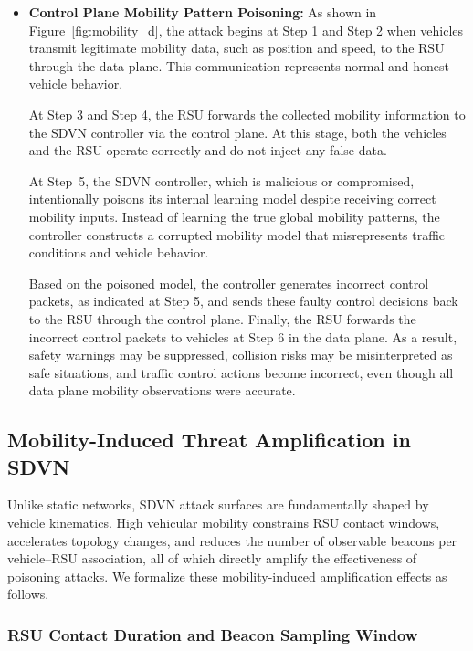 \documentclass[12pt, a4paper]{report}
\begin{document}
\begin{itemize}
	\item \textbf{Control Plane Mobility Pattern Poisoning:}
	As shown in Figure~\ref{fig:mobility_d}, the attack begins at Step 1 and Step 2 when
	vehicles transmit legitimate mobility data, such as position and speed, to the RSU
	through the data plane. This communication represents normal and honest vehicle
	behavior.

	At Step 3 and Step 4, the RSU forwards the collected mobility information to the
	SDVN controller via the control plane. At this stage, both the vehicles and the RSU
	operate correctly and do not inject any false data.

	At Step~5, the SDVN controller, which is malicious or compromised, intentionally
	poisons its internal learning model despite receiving correct mobility inputs. Instead
	of learning the true global mobility patterns, the controller constructs a corrupted
	mobility model that misrepresents traffic conditions and vehicle behavior.

	Based on the poisoned model, the controller generates incorrect control packets, as
	indicated at Step 5, and sends these faulty control decisions back to the RSU through
	the control plane. Finally, the RSU forwards the incorrect control packets to vehicles at Step 6 in the
	data plane. As a result, safety warnings may be suppressed, collision risks may be
	misinterpreted as safe situations, and traffic control actions become incorrect, even
	though all data plane mobility observations were accurate.

\end{itemize}

\subsection{Mobility-Induced Threat Amplification in SDVN}
\label{sec:mobility_amplification}

Unlike static networks, SDVN attack surfaces are fundamentally shaped by
vehicle kinematics. High vehicular mobility constrains RSU contact windows,
accelerates topology changes, and reduces the number of observable beacons per
vehicle--RSU association, all of which directly amplify the effectiveness of
poisoning attacks. We formalize these mobility-induced amplification effects as
follows.

\subsubsection{RSU Contact Duration and Beacon Sampling Window}
\end{document}

